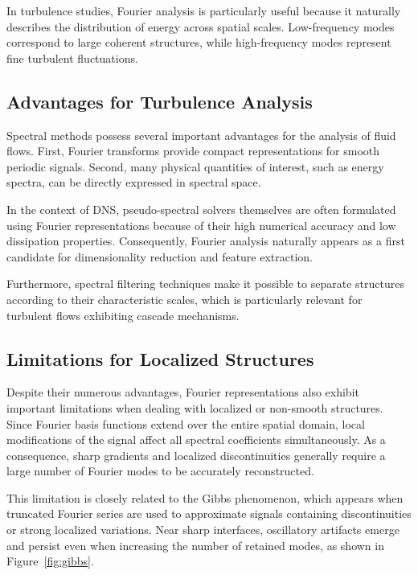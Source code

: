 In turbulence studies, Fourier analysis is particularly useful because it naturally describes the distribution of energy across spatial scales. Low-frequency modes correspond to large coherent structures, while high-frequency modes represent fine turbulent fluctuations.

\subsection{Advantages for Turbulence Analysis}

Spectral methods possess several important advantages for the analysis of fluid flows. First, Fourier transforms provide compact representations for smooth periodic signals. Second, many physical quantities of interest, such as energy spectra, can be directly expressed in spectral space.

In the context of DNS, pseudo-spectral solvers themselves are often formulated using Fourier representations because of their high numerical accuracy and low dissipation properties. Consequently, Fourier analysis naturally appears as a first candidate for dimensionality reduction and feature extraction.

Furthermore, spectral filtering techniques make it possible to separate structures according to their characteristic scales, which is particularly relevant for turbulent flows exhibiting cascade mechanisms.

\subsection{Limitations for Localized Structures}

Despite their numerous advantages, Fourier representations also exhibit important limitations when dealing with localized or non-smooth structures. Since Fourier basis functions extend over the entire spatial domain, local modifications of the signal affect all spectral coefficients simultaneously. As a consequence, sharp gradients and localized discontinuities generally require a large number of Fourier modes to be accurately reconstructed.

This limitation is closely related to the Gibbs phenomenon, which appears when truncated Fourier series are used to approximate signals containing discontinuities or strong localized variations. Near sharp interfaces, oscillatory artifacts emerge and persist even when increasing the number of retained modes, as shown in Figure~\ref{fig:gibbs}.


